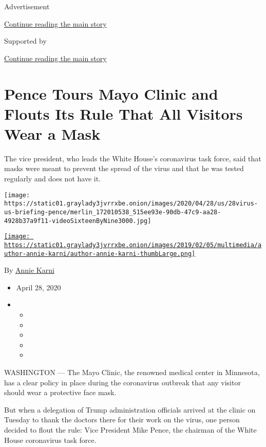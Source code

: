 Advertisement

\protect\hyperlink{after-top}{Continue reading the main story}

Supported by

\protect\hyperlink{after-sponsor}{Continue reading the main story}

\hypertarget{pence-tours-mayo-clinic-and-flouts-its-rule-that-all-visitors-wear-a-mask}{%
\section{Pence Tours Mayo Clinic and Flouts Its Rule That All Visitors
Wear a
Mask}\label{pence-tours-mayo-clinic-and-flouts-its-rule-that-all-visitors-wear-a-mask}}

The vice president, who leads the White House's coronavirus task force,
said that masks were meant to prevent the spread of the virus and that
he was tested regularly and does not have it.

\texttt{[image: https://static01.graylady3jvrrxbe.onion/images/2020/04/28/us/28virus-us-briefing-pence/merlin\_172010538\_515ee93e-90db-47c9-aa28-4928b37a9f11-videoSixteenByNine3000.jpg]}

\href{https://www.nytimes3xbfgragh.onion/by/annie-karni}{\texttt{[image: https://static01.graylady3jvrrxbe.onion/images/2019/02/05/multimedia/author-annie-karni/author-annie-karni-thumbLarge.png]}}

By \href{https://www.nytimes3xbfgragh.onion/by/annie-karni}{Annie Karni}

\begin{itemize}
\item
  April 28, 2020
\item
  \begin{itemize}
  \item
  \item
  \item
  \item
  \item
  \end{itemize}
\end{itemize}

WASHINGTON --- The Mayo Clinic, the renowned medical center in
Minnesota, has a clear policy in place during the coronavirus outbreak
that any visitor should wear a protective face mask.

But when a delegation of Trump administration officials arrived at the
clinic on Tuesday to thank the doctors there for their work on the
virus, one person decided to flout the rule: Vice President Mike Pence,
the chairman of the White House coronavirus task force.

